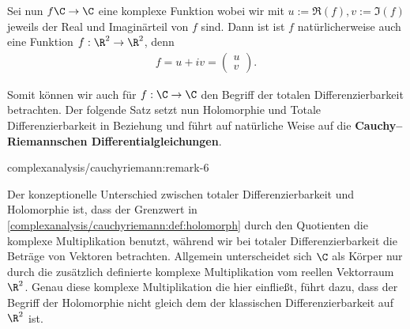 \documentclass[letterpaper,10pt,german]{jupyterBook}
\begin{document}
\par
Sei nun \(f\C\to\C\) eine komplexe Funktion wobei wir mit \(u:=\Re(f),v:=\Im(f)\) jeweils der Real  und Imaginärteil von \(f\) sind. Dann ist ist \(f\) natürlicherweise auch eine Funktion \(f:\R^2\to\R^2\), denn
\begin{align*}
f = u+iv = \begin{pmatrix} u\\ v\end{pmatrix}.
\end{align*}
\par
Somit können wir auch für \(f:\C\to\C\) den Begriff der totalen Differenzierbarkeit betrachten. Der folgende Satz setzt nun Holomorphie und Totale Differenzierbarkeit in Beziehung und führt auf natürliche Weise auf die \textbf{Cauchy–Riemannschen Differentialgleichungen}.
\begin{remark}{}{complexanalysis/cauchyriemann:remark-6}



\par
Der konzeptionelle Unterschied zwischen totaler Differenzierbarkeit und Holomorphie ist, dass der Grenzwert in \cref{complexanalysis/cauchyriemann:def:holomorph} durch den Quotienten die komplexe Multiplikation benutzt, während wir bei totaler Differenzierbarkeit die Beträge von Vektoren betrachten. Allgemein unterscheidet sich \(\C\) als Körper nur durch die zusätzlich definierte komplexe Multiplikation vom reellen Vektorraum \(\R^2\). Genau diese komplexe Multiplikation die hier einfließt, führt dazu, dass der Begriff der Holomorphie nicht gleich dem der klassischen Differenzierbarkeit auf \(\R^2\) ist.
\end{remark}
\end{document}
